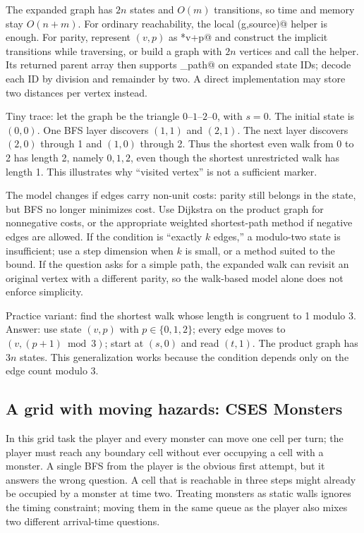 The expanded graph has $2n$ states and $O(m)$ transitions, so time and memory
stay $O(n+m)$. For ordinary reachability,
the local \verb@bfs(g,{source})@ helper is enough. For parity, represent
$(v,p)$ as *v+p@ and construct the implicit transitions while
traversing, or build a graph with $2n$ vertices and call the helper. Its
returned parent array then supports \verb@restore_path@ on expanded state
IDs; decode each ID by division and remainder by two. A direct implementation
may store two distances per vertex instead.

Tiny trace: let the graph be the triangle $0$--$1$--$2$--$0$, with $s=0$.
The initial state is $(0,0)$. One BFS layer discovers $(1,1)$ and $(2,1)$.
The next layer discovers $(2,0)$ through 1 and $(1,0)$ through 2. Thus the
shortest even walk from 0 to 2 has length 2, namely $0,1,2$, even though the
shortest unrestricted walk has length 1. This illustrates why ``visited
vertex'' is not a sufficient marker.

The model changes if edges carry non-unit costs: parity still belongs in the
state, but BFS no longer minimizes cost. Use Dijkstra on the product graph
for nonnegative costs, or the appropriate weighted shortest-path method if
negative edges are allowed. If the condition is ``exactly $k$ edges,'' a
modulo-two state is insufficient; use a step dimension when $k$ is small, or
a method suited to the bound. If the question asks for a simple path, the
expanded walk can revisit an original vertex with a different parity, so the
walk-based model alone does not enforce simplicity.

Practice variant: find the shortest walk whose length is congruent to 1
modulo 3. Answer: use state $(v,p)$ with $p\in\{0,1,2\}$; every edge moves
to $(v,(p+1)\bmod 3)$; start at $(s,0)$ and read $(t,1)$. The product graph
has $3n$ states. This generalization works because the condition depends
only on the edge count modulo 3.

\subsection{A grid with moving hazards: CSES Monsters}
\label{case:hazards}

In this grid task the player and every monster can move one cell per turn;
the player must reach any boundary cell without ever occupying a cell with a
monster. A single BFS from the player is the obvious first attempt, but it
answers the wrong question. A cell that is reachable in three steps might
already be occupied by a monster at time two. Treating monsters as static
walls ignores the timing constraint; moving them in the same queue as the
player also mixes two different arrival-time questions.


